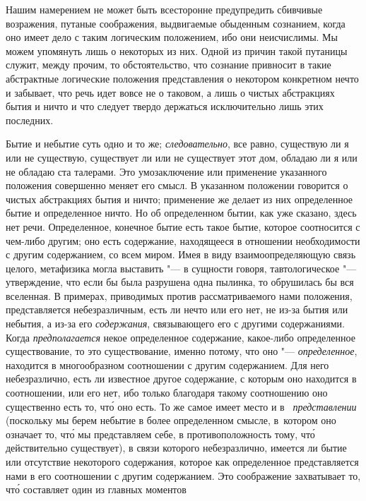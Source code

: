 Нашим намерением не может быть всесторонне предупредить сбивчивые возражения,
путаные соображения, выдвигаемые обыденным сознанием, когда оно имеет дело с
таким логическим положением, ибо они неисчислимы. Мы можем упомянуть лишь о
некоторых из них. Одной из причин такой путаницы служит, между прочим, то
обстоятельство, что сознание привносит в такие абстрактные логические положения
представления о некотором конкретном нечто и забывает, что речь идет вовсе не о
таковом, а лишь о чистых абстракциях бытия и ничто и что следует твердо
держаться исключительно лишь этих последних.

Бытие и небытие суть одно и то же; {\em следовательно}, все равно, существую ли
я или не существую, существует ли или не существует этот дом, обладаю ли я или
не обладаю ста талерами. Это умозаключение или применение указанного положения
совершенно меняет его смысл. В указанном положении говорится о чистых
абстракциях бытия и ничто; применение же делает из них определенное бытие и
определенное ничто. Но об определенном бытии, как уже сказано, здесь нет речи.
Определенное, конечное бытие есть такое бытие, которое соотносится с чем-либо
другим; оно есть содержание, находящееся в отношении необходимости с другим
содержанием, со всем миром. Имея в виду взаимоопределяющую связь целого,
метафизика могла выставить "--- в сущности говоря, тавтологическое "---
утверждение, что если бы была разрушена одна пылинка, то обрушилась бы вся
вселенная. В примерах, приводимых против рассматриваемого нами положения,
представляется небезразличным, есть ли нечто или его нет, не из-за бытия или
небытия, а из-за его {\em содержания}, связывающего его с другими содержаниями.
Когда {\em предполагается} некое определенное содержание, какое-либо
определенное существование, то это существование, именно потому, что оно "---
{\em определенное}, находится в многообразном соотношении с другим содержанием.
Для него небезразлично, есть ли известное другое содержание, с которым оно
находится в соотношении, или его нет, ибо только благодаря такому соотношению
оно существенно есть то, чт\'{о} оно есть. То же самое имеет место и в~{\em
представлении} (поскольку мы берем небытие в более определенном смысле,
в~котором оно означает то, чт\'{о} мы представляем себе, в противоположность
тому, чт\'{о} действительно существует), в связи которого небезразлично,
имеется ли бытие или отсутствие некоторого содержания, которое как определенное
представляется нами в его соотношении с другим содержанием. \label{bkm:bm85a}
Это соображение захватывает то, чт\'{о} составляет один из главных моментов
